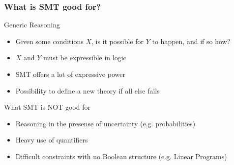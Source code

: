 \documentclass[svgnames,table,mathserif]{beamer}
\newcommand{\mth}[1]{{\color{dgreen}\ensuremath{#1}}}
\begin{document}
\begin{frame}
\frametitle{What is SMT good for?}

\begin{block}{Generic Reasoning}
\begin{itemize}
\item Given some conditions \mth{X}, is it possible for \mth{Y} to happen, and if so how?
\item \mth{X} and \mth{Y} must be expressible in logic
\item SMT offers a lot of expressive power
\item Possibility to define a new theory if all else fails
\end{itemize}
\end{block}

\begin{block}{What SMT is NOT good for}
\begin{itemize}
\item Reasoning in the presense of uncertainty (e.g. probabilities)
\item Heavy use of quantifiers
\item Difficult constraints with no Boolean structure (e.g. Linear Programs)
\end{itemize}
\end{block}

\end{frame}
\end{document}
